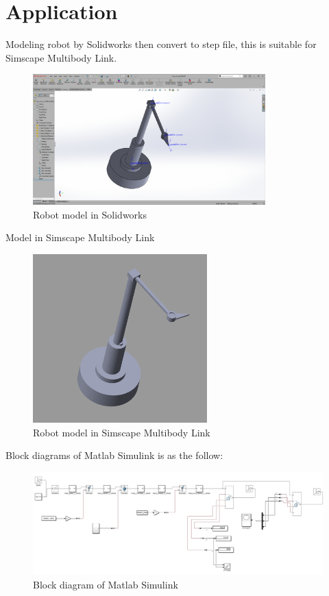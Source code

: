         
    \section{Application}
    Modeling robot by Solidworks then convert to step file, this is suitable for Simscape 
    Multibody Link.
    \begin{figure}[H]
        \centering
        \includegraphics[width=0.8\textwidth]{pictures/solid.png}
        \caption{Robot model in Solidworks}
        \label{fig:robot_model}
    \end{figure}
    Model in Simscape Multibody Link
    \begin{figure}[H]
        \centering
        \includegraphics[width=0.6\textwidth]{pictures/simscape.png}
        \caption{Robot model in Simscape Multibody Link}
        \label{fig:simscape_model}
    \end{figure}
    Block diagrams of Matlab Simulink is as the follow:
    \begin{figure}[H]
        \centering
        \includegraphics[width=1\textwidth]{pictures/simulink.png}
        \caption{Block diagram of Matlab Simulink}
        \label{fig:simulink_block_diagram}
    \end{figure}
